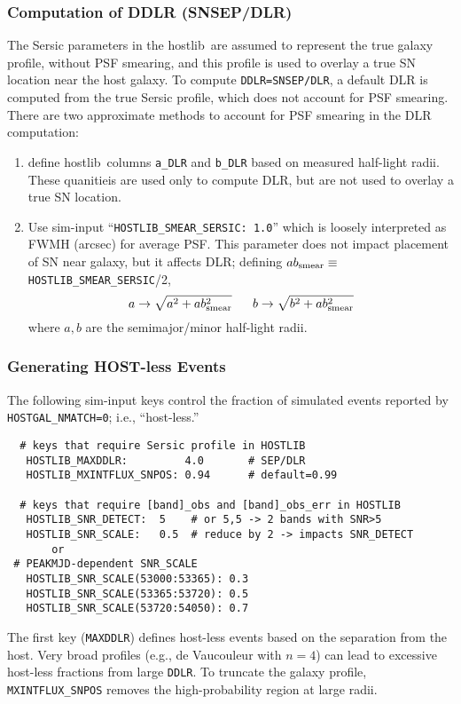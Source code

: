 \documentclass[12pt]{article}
\newcommand{\hostlib}{{\sc hostlib}}
\begin{document}
{%
\subsubsection{Computation of DDLR (SNSEP/DLR) }
\label{sss:hostlib_ddlr}

The Sersic parameters in the \hostlib\ are assumed to represent
the true galaxy profile, without PSF smearing, and this profile
is used to overlay a true SN location near the host galaxy. 
To compute {\tt DDLR=SNSEP/DLR}, a default DLR is computed from the 
true Sersic profile, which does not account for PSF smearing.
There are two approximate methods to account for PSF smearing
in the DLR computation:
%
\newcommand{\absmear}{ab_{\rm smear}}
\begin{enumerate}[noitemsep]
   \item define \hostlib\ columns {\tt a\_DLR} and {\tt b\_DLR} based
       on measured half-light radii. These quanitieis are used only
       to compute DLR, but are not used to overlay a true SN location.
%
   \item Use sim-input ``{\tt HOSTLIB\_SMEAR\_SERSIC: 1.0}'' which
     is loosely interpreted as FWMH (arcsec) for average PSF.
     This parameter does not impact placement of SN near galaxy,
     but it affects DLR; 
     defining $\absmear\equiv${\tt HOSTLIB\_SMEAR\_SERSIC}/2,
       \begin{equation}
         a \to \sqrt{a^2 + \absmear^2} ~~~~~
         b \to \sqrt{b^2 + \absmear^2}
       \end{equation}
     where $a,b$ are the semimajor/minor half-light radii.
\end{enumerate}

\clearpage
\subsubsection{Generating HOST-less Events}

The following sim-input keys control the fraction of simulated
events reported by {\tt HOSTGAL\_NMATCH=0}; i.e., ``host-less.''
\begin{verbatim}
  # keys that require Sersic profile in HOSTLIB
   HOSTLIB_MAXDDLR:         4.0       # SEP/DLR
   HOSTLIB_MXINTFLUX_SNPOS: 0.94      # default=0.99

  # keys that require [band]_obs and [band]_obs_err in HOSTLIB
   HOSTLIB_SNR_DETECT:  5    # or 5,5 -> 2 bands with SNR>5
   HOSTLIB_SNR_SCALE:   0.5  # reduce by 2 -> impacts SNR_DETECT
       or
 # PEAKMJD-dependent SNR_SCALE
   HOSTLIB_SNR_SCALE(53000:53365): 0.3
   HOSTLIB_SNR_SCALE(53365:53720): 0.5
   HOSTLIB_SNR_SCALE(53720:54050): 0.7
\end{verbatim}
%
The first key ({\tt MAXDDLR}) defines host-less events based on
the separation from the host. 
Very broad profiles (e.g., de Vaucouleur with $n=4$) can lead
to excessive host-less fractions from large {\tt DDLR}.
To truncate the galaxy profile, {\tt MXINTFLUX\_SNPOS} removes
the high-probability region at large radii.

}
\end{document}

